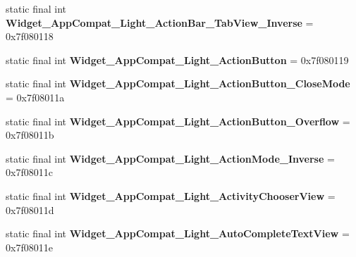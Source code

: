 \begin{DoxyCompactItemize}
\item 
\hypertarget{classandroid_1_1support_1_1design_1_1_r_1_1style_a98e2bea27b6e8d254311f92404db5f46}{}static final int {\bfseries Widget\+\_\+\+App\+Compat\+\_\+\+Light\+\_\+\+Action\+Bar\+\_\+\+Tab\+View\+\_\+\+Inverse} = 0x7f080118\label{classandroid_1_1support_1_1design_1_1_r_1_1style_a98e2bea27b6e8d254311f92404db5f46}

\item 
\hypertarget{classandroid_1_1support_1_1design_1_1_r_1_1style_acd9731de4a76e4f4d04e4f015f364dbd}{}static final int {\bfseries Widget\+\_\+\+App\+Compat\+\_\+\+Light\+\_\+\+Action\+Button} = 0x7f080119\label{classandroid_1_1support_1_1design_1_1_r_1_1style_acd9731de4a76e4f4d04e4f015f364dbd}

\item 
\hypertarget{classandroid_1_1support_1_1design_1_1_r_1_1style_a350ce12c6ed18a70a865f563d8e4c8bb}{}static final int {\bfseries Widget\+\_\+\+App\+Compat\+\_\+\+Light\+\_\+\+Action\+Button\+\_\+\+Close\+Mode} = 0x7f08011a\label{classandroid_1_1support_1_1design_1_1_r_1_1style_a350ce12c6ed18a70a865f563d8e4c8bb}

\item 
\hypertarget{classandroid_1_1support_1_1design_1_1_r_1_1style_a3af81c29dece82cd8a9c1200d4287c5b}{}static final int {\bfseries Widget\+\_\+\+App\+Compat\+\_\+\+Light\+\_\+\+Action\+Button\+\_\+\+Overflow} = 0x7f08011b\label{classandroid_1_1support_1_1design_1_1_r_1_1style_a3af81c29dece82cd8a9c1200d4287c5b}

\item 
\hypertarget{classandroid_1_1support_1_1design_1_1_r_1_1style_a6e1722fbff8cb1145ad90f0ee788cf4e}{}static final int {\bfseries Widget\+\_\+\+App\+Compat\+\_\+\+Light\+\_\+\+Action\+Mode\+\_\+\+Inverse} = 0x7f08011c\label{classandroid_1_1support_1_1design_1_1_r_1_1style_a6e1722fbff8cb1145ad90f0ee788cf4e}

\item 
\hypertarget{classandroid_1_1support_1_1design_1_1_r_1_1style_af07a14791a23f65ae9b307e705db296d}{}static final int {\bfseries Widget\+\_\+\+App\+Compat\+\_\+\+Light\+\_\+\+Activity\+Chooser\+View} = 0x7f08011d\label{classandroid_1_1support_1_1design_1_1_r_1_1style_af07a14791a23f65ae9b307e705db296d}

\item 
\hypertarget{classandroid_1_1support_1_1design_1_1_r_1_1style_ac380b3f53f40de9211056c64b6f66307}{}static final int {\bfseries Widget\+\_\+\+App\+Compat\+\_\+\+Light\+\_\+\+Auto\+Complete\+Text\+View} = 0x7f08011e\label{classandroid_1_1support_1_1design_1_1_r_1_1style_ac380b3f53f40de9211056c64b6f66307}


\end{DoxyCompactItemize}
